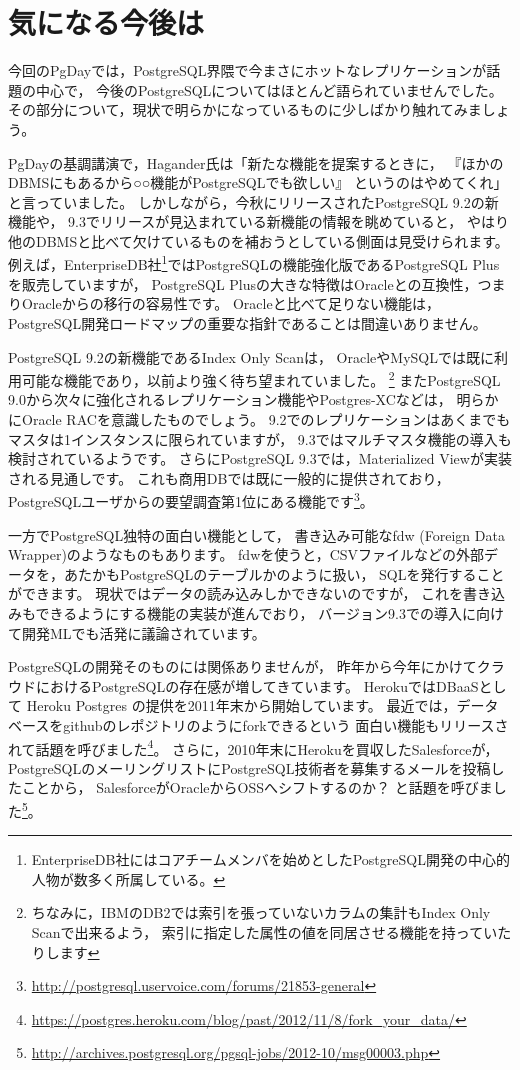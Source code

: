 \section{気になる今後は}

今回のPgDayでは，PostgreSQL界隈で今まさにホットなレプリケーションが話題の中心で，
今後のPostgreSQLについてはほとんど語られていませんでした。
その部分について，現状で明らかになっているものに少しばかり触れてみましょう。

PgDayの基調講演で，Hagander氏は「新たな機能を提案するときに，
『ほかのDBMSにもあるから○○機能がPostgreSQLでも欲しい』
というのはやめてくれ」と言っていました。
しかしながら，今秋にリリースされたPostgreSQL 9.2の新機能や，
9.3でリリースが見込まれている新機能の情報を眺めていると，
やはり他のDBMSと比べて欠けているものを補おうとしている側面は見受けられます。
例えば，EnterpriseDB社\footnote{EnterpriseDB社にはコアチームメンバを始めとしたPostgreSQL開発の中心的人物が数多く所属している。}ではPostgreSQLの機能強化版であるPostgreSQL Plusを販売していますが，
PostgreSQL Plusの大きな特徴はOracleとの互換性，つまりOracleからの移行の容易性です。
Oracleと比べて足りない機能は，PostgreSQL開発ロードマップの重要な指針であることは間違いありません。

PostgreSQL 9.2の新機能であるIndex Only Scanは，
OracleやMySQLでは既に利用可能な機能であり，以前より強く待ち望まれていました。
\footnote{ちなみに，IBMのDB2では索引を張っていないカラムの集計もIndex Only Scanで出来るよう，
索引に指定した属性の値を同居させる機能を持っていたりします}
またPostgreSQL 9.0から次々に強化されるレプリケーション機能やPostgres-XCなどは，
明らかにOracle RACを意識したものでしょう。
9.2でのレプリケーションはあくまでもマスタは1インスタンスに限られていますが，
9.3ではマルチマスタ機能の導入も検討されているようです。
さらにPostgreSQL 9.3では，Materialized Viewが実装される見通しです。
これも商用DBでは既に一般的に提供されており，
PostgreSQLユーザからの要望調査第1位にある機能です\footnote{\url{http://postgresql.uservoice.com/forums/21853-general}}。

一方でPostgreSQL独特の面白い機能として，
書き込み可能なfdw (Foreign Data Wrapper)のようなものもあります。
fdwを使うと，CSVファイルなどの外部データを，あたかもPostgreSQLのテーブルかのように扱い，
SQLを発行することができます。
現状ではデータの読み込みしかできないのですが，
これを書き込みもできるようにする機能の実装が進んでおり，
バージョン9.3での導入に向けて開発MLでも活発に議論されています。

PostgreSQLの開発そのものには関係ありませんが，
昨年から今年にかけてクラウドにおけるPostgreSQLの存在感が増してきています。
HerokuではDBaaSとして Heroku Postgres の提供を2011年末から開始しています。
最近では，データベースをgithubのレポジトリのようにforkできるという
面白い機能もリリースされて話題を呼びました\footnote{\url{https://postgres.heroku.com/blog/past/2012/11/8/fork_your_data/}}。
さらに，2010年末にHerokuを買収したSalesforceが，
PostgreSQLのメーリングリストにPostgreSQL技術者を募集するメールを投稿したことから，
SalesforceがOracleからOSSへシフトするのか？
と話題を呼びました\footnote{\url{http://archives.postgresql.org/pgsql-jobs/2012-10/msg00003.php}}。

